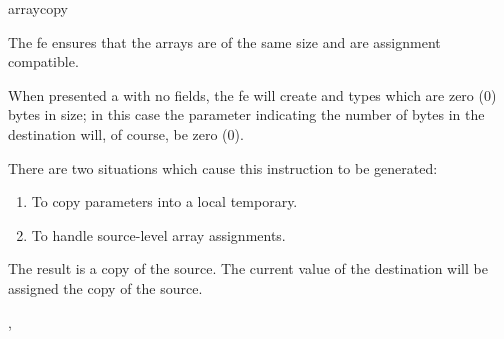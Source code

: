 \begin{instruction}{arraycopy}

  \begin{notes}
    The \ac{fe} ensures that the arrays are of the same size and are
    assignment compatible.

    When presented a  with no fields, the \ac{fe} will
    create  and  types which are zero (0)
    bytes in size; in this case the parameter indicating the number of
    bytes in the destination will, of course, be zero (0).

    There are two situations which cause this instruction to be
    generated:
    \begin{enumerate}
    \item To copy \byval parameters into a local temporary.
    \item To handle source-level array assignments.
    \end{enumerate}
  \end{notes}

  \begin{results}
  \item The result is a copy of the source.  The current value of the
    destination will be assigned the copy of the source.
  \end{results}

  \begin{operands}
  \item {}
  \item {}
  \item {}
  \item {}
  \item {}
  \end{operands}

  \begin{seealso}
    , 
  \end{seealso}
\end{instruction}


